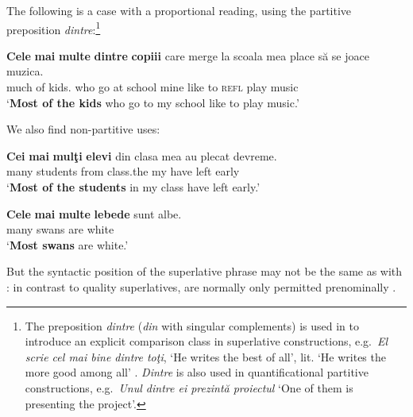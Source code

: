\documentclass[output=paper
,modfonts
,nonflat]{langsci/langscibook}
\begin{document}
The following  is a case with a proportional reading, using the partitive preposition \textit{dintre}:\footnote{The preposition \textit{dintre} (\textit{din} with singular complements) is used in  to introduce an explicit comparison class in superlative constructions, e.g.\ \textit{El scrie cel mai bine dintre toţi}, `He writes the best of all', lit. `He writes the more good among all' \citep[169]{Cojocaru2003}.  \textit{Dintre} is also used in quantificational partitive constructions, e.g.\ \textit{Unul dintre ei prezintă proiectul} `One of them is presenting the project'.}

\ea \label{ex:coppockstrand:43}
\gll \textbf{Cele} \textbf{mai} \textbf{multe} \textbf{dintre} \textbf{copiii} care merge la scoala mea place să se joace muzica.\\
 \cmpr{} {much} of kids. who go at school mine like to \textsc{refl} play music \\
\glt `\textbf{Most of the kids} who go to my school like to play music.' 
\z

We also find non-partitive uses:

\ea \label{ex:coppockstrand:44}
\gll \textbf{Cei} \textbf{mai} \textbf{mulţi} \textbf{elevi} din clasa mea au plecat devreme.\\
 \cmpr{} many students from class.the my have left early\\
\glt `\textbf{Most of the students} in my class have left early.'
\z

\ea \label{ex:coppockstrand:45}
\gll \textbf{Cele} \textbf{mai} \textbf{multe} \textbf{lebede} sunt albe.\\
 \cmpr{} many swans are white\\
\glt `\textbf{Most swans} are white.'
\z

But the syntactic position of the superlative phrase may not be the same as with : in contrast to quality superlatives,  are normally only permitted prenominally \citep[11]{Teodorescu2007}.

\z
\end{document}
